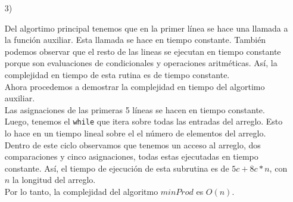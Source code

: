 \documentclass[a4paper, 12pt]{report}
\begin{document}
\begin{enumerate}
{\begin{enumerate}
{{    Ahora pasamos a minProd. Esencialmente sabemos que, si hay números
    negativos, la mejor opción es el negativo más grande PERO, si sólo
    hay negativos, es imposible hacerlo así que necesitamos los números
    más pequeños (por valor absoluto) para generar el producto mínimo.
    Si bien no hay ningún negativo, es evidente que necesitamos los
    menores números para tener el menor producto (incluso si uno es
    cero). Nuestro algoritmo se lee igual por casos inducidos en el If
    y como ya revisamos cada caso es adecuado.
    
    Ergo también es correcto
    }
    }
    \item[3)]{Del algortimo principal tenemos que en la primer línea se hace una
        llamada a la función auxiliar. Esta llamada se hace en tiempo constante.
        También podemos observar que el resto de las lineas se ejecutan en
        tiempo constante porque son evaluaciones de condicionales y operaciones
        aritméticas. Así, la complejidad en tiempo de esta rutina es de
        tiempo constante.\\
        Ahora procedemos a demostrar la complejidad en tiempo del algortimo
        auxiliar.\\
        Las asignaciones de las primeras 5 líneas se hacen en tiempo constante.
        Luego, tenemos el \texttt{while} que itera sobre todas las entradas del
        arreglo. Esto lo hace en un tiempo lineal sobre el el número de
        elementos del arreglo. Dentro de este ciclo observamos que tenemos un
        acceso al arreglo, dos comparaciones y cinco asignaciones, todas estas
        ejecutadas en tiempo constante. Así, el tiempo de ejecución de esta
        subrutina es de $5c+8c*n$, con $n$ la longitud del arreglo.\\
        Por lo tanto, la complejidad del algoritmo $minProd$ es $O(n)$.

    }
\end{enumerate}
}
\end{enumerate}
\end{document}
